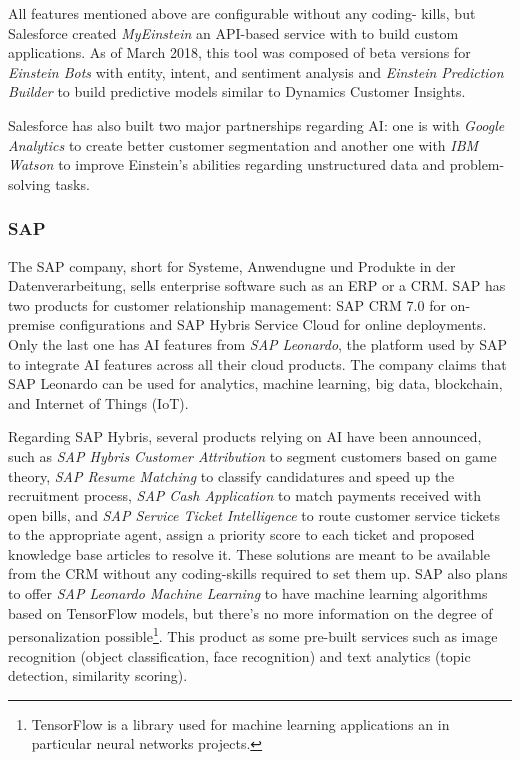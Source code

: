All features mentioned above are configurable without any coding- kills, but Salesforce created \textit{MyEinstein} an API-based service with to build custom applications. As of March 2018, this tool was composed of beta versions for \textit{Einstein Bots} with entity, intent, and sentiment analysis and \textit{Einstein Prediction Builder} to build predictive models similar to Dynamics Customer Insights.

Salesforce has also built two major partnerships regarding AI: one is with \textit{Google Analytics} to create better customer segmentation and another one with \textit{IBM Watson} to improve Einstein's abilities regarding unstructured data and problem-solving tasks.

\subsubsection*{SAP}
The SAP company, short for Systeme, Anwendugne und Produkte in der Datenverarbeitung, sells enterprise software such as an ERP or a CRM. SAP has two products for customer relationship management: SAP CRM 7.0 for on-premise configurations and SAP Hybris Service Cloud for online deployments. Only the last one has AI features from \textit{SAP Leonardo}, the platform used by SAP to integrate AI features across all their cloud products. The company claims that SAP Leonardo can be used for analytics, machine learning, big data, blockchain, and Internet of Things (IoT).

Regarding SAP Hybris, several products relying on AI have been announced, such as \textit{SAP Hybris Customer Attribution} to segment customers based on game theory, \textit{SAP Resume Matching} to classify candidatures and speed up the recruitment process, \textit{SAP Cash Application} to match payments received with open bills, and \textit{SAP Service Ticket Intelligence} to route customer service tickets to the appropriate agent, assign a priority score to each ticket and proposed knowledge base articles to resolve it. These solutions are meant to be available from the CRM without any coding-skills required to set them up. SAP also plans to offer \textit{SAP Leonardo Machine Learning} to have machine learning algorithms based on TensorFlow models, but there's no more information on the degree of personalization possible\footnote{TensorFlow is a library used for machine learning applications an in particular neural networks projects.}. This product as some pre-built services such as image recognition (object classification, face recognition) and text analytics (topic detection, similarity scoring). 

